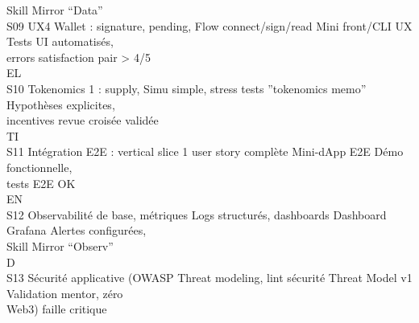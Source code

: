 Skill Mirror “Data”\\
S09     UX4 Wallet : signature, pending,     Flow connect/sign/read             Mini front/CLI UX        Tests UI automatisés,\\
errors                                                                                           satisfaction pair \textgreater{} 4/5\\
\vspace{0.5em}
\vspace{0.5em}
\vspace{0.5em}
\vspace{0.5em}
EL\\
S10     Tokenomics 1 : supply,               Simu simple, stress tests          ”tokenomics memo”        Hypothèses explicites,\\
incentives                                                                                       revue croisée validée\\
\vspace{0.5em}
\vspace{0.5em}
\vspace{0.5em}
\vspace{0.5em}
TI\\
S11     Intégration E2E : vertical slice     1 user story complète              Mini-dApp E2E            Démo fonctionnelle,\\
tests E2E OK\\
\vspace{0.5em}
\vspace{0.5em}
\vspace{0.5em}
\vspace{0.5em}
EN\\
S12     Observabilité de base, métriques     Logs structurés, dashboards        Dashboard Grafana        Alertes configurées,\\
Skill Mirror “Observ”\\
\vspace{0.5em}
\vspace{0.5em}
\vspace{0.5em}
\vspace{0.5em}
D\\
S13     Sécurité applicative (OWASP          Threat modeling, lint sécurité     Threat Model v1          Validation mentor, zéro\\
Web3)                                                                                            faille critique\\
\vspace{0.5em}
